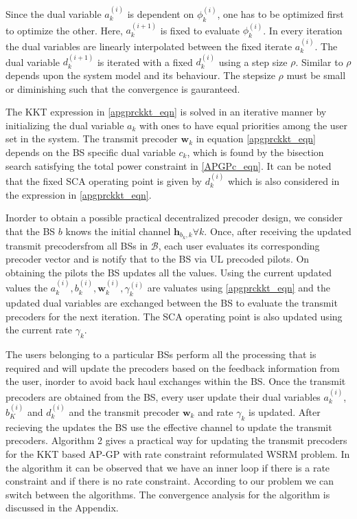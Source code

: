 \documentclass[a4paper, 12pt,titlepage]{dithesis} %
\newcommand{\me}[1]{\( #1 \)}
\begin{document}
Since the dual variable \me{a_k^{(i)}} is dependent on \me{\phi_k^{(i)}}, one has to be optimized first to optimize the other. Here, \me{a_k^{(i+1)}} is fixed to evaluate \me{\phi_k^{(i)}}. In every iteration the dual variables are linearly interpolated between the fixed iterate \me{a_k^{(i)}}. The dual variable \me{d_k^{(i + 1)}} is iterated with a fixed \me{d_k^{(i)}} using a step size \me{\rho}. Similar to \me{\rho} depends upon the system model and its behaviour. The stepsize \me{\rho} must be small or diminishing such that the convergence is gauranteed.

The \ac{KKT} expression in \eqref{apgprckkt_eqn} is solved in an iterative manner by initializing the dual variable \me{a_k} with ones to have equal priorities among the user set in the system. The transmit precoder \me{\mathbf{w}_k} in equation \eqref{apgprckkt_eqn} depends on the \ac{BS} specific dual variable \me{c_k}, which is found by the bisection search satisfying the total power constraint in \eqref{APGPc_eqn}. It can be noted that the fixed \ac{SCA} operating point is given by \me{d_k^{(i)}} which is also considered in the expression in \eqref{apgprckkt_eqn}.

Inorder to obtain a possible practical decentralized precoder design, we consider that the \ac{BS} \me{b} knows the initial channel \me{\mathbf{h}_{b_k,k} \forall k}. Once, after receiving the updated transmit precodersfrom all \ac{BS}s in \me{\mathcal{B}}, each user evaluates its corresponding precoder vector and is notify that to the \ac{BS} via \ac{UL} precoded pilots. On obtaining the pilots the \ac{BS} updates all the values. Using the current updated values the \me{a_k^{(i)}, b_k^{(i)}, \mathbf{w}_k^{(i)}, \gamma_k^{(i)}} are valuates using \eqref{apgprckkt_eqn} and the updated dual variables are exchanged between the \ac{BS} to evaluate the transmit precoders for the next iteration. The \ac{SCA} operating point is also updated using the current rate \me{\gamma_k}. 

The users belonging to a particular \ac{BS}s perform all the processing that is required and will update the precoders based on the feedback information from the user, inorder to avoid back haul exchanges within the \ac{BS}. Once the transmit precoders are obtained from the \ac{BS}, every user update their dual variables \me{a_k^{(i)}}, \me{b_K^{(i)}} and \me{d_k^{(i)}} and the transmit precoder \me{\mathbf{w}_k} and rate \me{\gamma_k} is updated. After recieving the updates the \ac{BS} use the effective channel to update the transmit precoders. Algorithm 2 gives a practical way for updating the transmit precoders for the \ac{KKT} based AP-GP with rate constraint reformulated \ac{WSRM} problem. In the algorithm it can be observed that we have an inner loop if there is a rate constraint and if there is no rate constraint. According to our problem we can switch between the algorithms. The convergence analysis for the algorithm is discussed in the Appendix.
\end{document}
